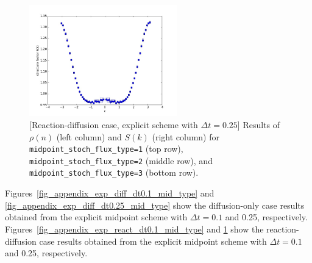 \documentclass{article}
\begin{document}
\begin{figure}
\includegraphics[width=0.5\linewidth,height=1.9in]{fig1/appendix_exp_react_dt0.25_Sk_mid3.jpg}
\caption{\label{fig_appendix_exp_react_dt0.25_mid_type}[Reaction-diffusion case, explicit scheme with $\Delta t=0.25$] Results of $\rho(n)$ (left column) and $S(k)$ (right column) for \texttt{midpoint\_stoch\_flux\_type=1} (top row), \texttt{midpoint\_stoch\_flux\_type=2} (middle row), and \texttt{midpoint\_stoch\_flux\_type=3} (bottom row).
}
\end{figure}

Figures~\ref{fig_appendix_exp_diff_dt0.1_mid_type} and \ref{fig_appendix_exp_diff_dt0.25_mid_type} show the diffusion-only case results obtained from the explicit midpoint scheme with $\Delta t=0.1$ and 0.25, respectively.
Figures~\ref{fig_appendix_exp_react_dt0.1_mid_type} and \ref{fig_appendix_exp_react_dt0.25_mid_type} show the reaction-diffusion case results obtained from the explicit midpoint scheme with $\Delta t=0.1$ and 0.25, respectively.
\end{document}
